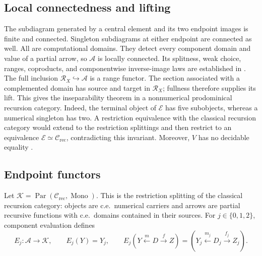 \documentclass[11pt]{article}
\begin{document}
\subsection{Local connectedness and lifting}

The subdiagram generated by a central element and its two endpoint
images is finite and connected. Singleton subdiagrams at either endpoint
are connected as well. All are computational domains. They detect every
component domain and value of a partial arrow, so $\mathcal A$ is locally
connected. Its splitness, weak choice, ranges, coproducts, and
componentwise inverse-image laws are established in
\cite[Proposition 2.2]{ThreePoint}.
The full inclusion $\mathscr R_X\hookrightarrow\mathcal A$ is a
range functor.
The section associated with a complemented domain has source and target
in $\mathscr R_X$; fullness therefore supplies its lift. This gives the
inseparability theorem in a nonnumerical prodominical recursion category.
Indeed, the terminal object of $\mathcal E$ has five subobjects,
whereas a numerical singleton has two.
A restriction equivalence with the classical recursion category
would extend to the restriction splittings and then restrict to an
equivalence $\mathcal E\simeq\mathcal C_{\mathrm{rec}}$, contradicting
this invariant. Moreover, $V$ has no decidable equality
\cite[Proposition 6.1]{ThreePoint}.

\subsection{Endpoint functors}

Let
$\mathcal K=\operatorname{Par}(\mathcal C_{\mathrm{rec}},\operatorname{Mono})$.
This is the restriction splitting of the classical recursion category:
objects are c.e.\ numerical carriers and arrows are partial recursive
functions with c.e.\ domains contained in their sources.
For $j\in\{0,1,2\}$, component evaluation defines
\begin{equation}\label{eq:endpoint-functor}
 E_j:\mathcal A\longrightarrow\mathcal K,\qquad
 E_j(Y)=Y_j,\qquad
 E_j(Y\xleftarrow{m}D\xrightarrow{f}Z)
   =(Y_j\xleftarrow{m_j}D_j\xrightarrow{f_j}Z_j).
\end{equation}
\end{document}
